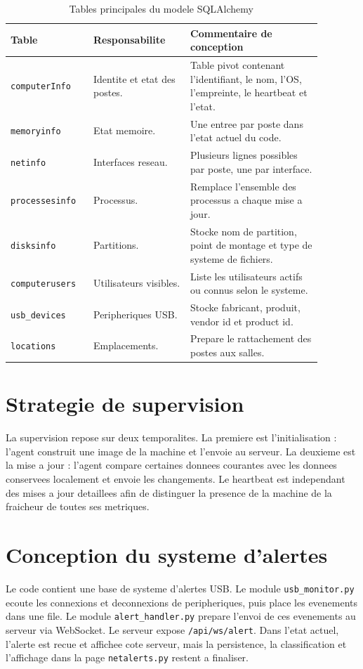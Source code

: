 \documentclass[12pt,a4paper]{report}
\begin{document}
\begin{longtable}{p{0.22\linewidth}p{0.28\linewidth}p{0.38\linewidth}}
\caption{Tables principales du modele SQLAlchemy}\\
\toprule
\textbf{Table} & \textbf{Responsabilite} & \textbf{Commentaire de conception}\\
\midrule
\texttt{computerInfo} & Identite et etat des postes. & Table pivot contenant l'identifiant, le nom, l'OS, l'empreinte, le heartbeat et l'etat.\\
\texttt{memoryinfo} & Etat memoire. & Une entree par poste dans l'etat actuel du code.\\
\texttt{netinfo} & Interfaces reseau. & Plusieurs lignes possibles par poste, une par interface.\\
\texttt{processesinfo} & Processus. & Remplace l'ensemble des processus a chaque mise a jour.\\
\texttt{disksinfo} & Partitions. & Stocke nom de partition, point de montage et type de systeme de fichiers.\\
\texttt{computerusers} & Utilisateurs visibles. & Liste les utilisateurs actifs ou connus selon le systeme.\\
\texttt{usb\_devices} & Peripheriques USB. & Stocke fabricant, produit, vendor id et product id.\\
\texttt{locations} & Emplacements. & Prepare le rattachement des postes aux salles.\\
\bottomrule
\end{longtable}

\section{Strategie de supervision}
La supervision repose sur deux temporalites. La premiere est l'initialisation : l'agent construit une image de la machine et l'envoie au serveur. La deuxieme est la mise a jour : l'agent compare certaines donnees courantes avec les donnees conservees localement et envoie les changements. Le heartbeat est independant des mises a jour detaillees afin de distinguer la presence de la machine de la fraicheur de toutes ses metriques.

\section{Conception du systeme d'alertes}
Le code contient une base de systeme d'alertes USB. Le module \texttt{usb\_monitor.py} ecoute les connexions et deconnexions de peripheriques, puis place les evenements dans une file. Le module \texttt{alert\_handler.py} prepare l'envoi de ces evenements au serveur via WebSocket. Le serveur expose \texttt{/api/ws/alert}. Dans l'etat actuel, l'alerte est recue et affichee cote serveur, mais la persistence, la classification et l'affichage dans la page \texttt{netalerts.py} restent a finaliser.
\end{document}
